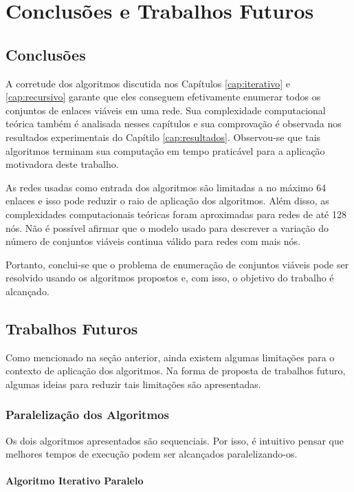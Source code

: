 \chapter{Conclusões e Trabalhos Futuros}
\label{cap:conclusoes}

\section{Conclusões}

A corretude dos algoritmos discutida nos Capítulos \ref{cap:iterativo} e \ref{cap:recursivo} garante que eles conseguem efetivamente enumerar todos os conjuntos de enlaces viáveis em uma rede. Sua complexidade computacional teórica também é analisada nesses capítulos e sua comprovação é observada nos resultados experimentais do Capítilo \ref{cap:resultados}. Observou-se que tais algoritmos terminam sua computação em tempo praticável para a aplicação motivadora deste trabalho. 

As redes usadas como entrada dos algoritmos são limitadas a no máximo 64 enlaces e isso pode reduzir o raio de aplicação dos algoritmos. Além disso, as complexidades computacionais teóricas foram aproximadas para redes de até 128 nós. Não é possível afirmar que o modelo usado para descrever a variação do número de conjuntos viáveis continua válido para redes com mais nós.

Portanto, conclui-se que o problema de enumeração de conjuntos viáveis pode ser resolvido usando os algoritmos propostos e, com isso, o objetivo do trabalho é alcançado.

\section{Trabalhos Futuros}

Como mencionado na seção anterior, ainda existem algumas limitações para o contexto de aplicação dos algoritmos. Na forma de proposta de trabalhos futuro, algumas ideias para reduzir tais limitações são apresentadas.

\subsection{Paralelização dos Algoritmos}

Os dois algoritmos apresentados são sequenciais. Por isso, é intuitivo pensar que melhores tempos de execução podem ser alcançados paralelizando-os. 

\subsubsection{Algoritmo Iterativo Paralelo}

